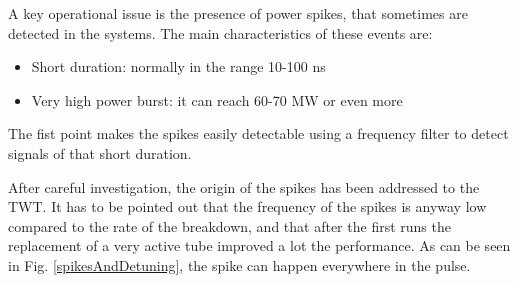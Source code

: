 A key operational issue is the presence of power spikes, that sometimes are detected in the systems. The main characteristics of these events are:
\begin{itemize}
\item Short duration: normally in the range 10-100 ns
\item Very high power burst: it can reach 60-70 MW or even more 
\end{itemize}
The fist point makes the spikes easily detectable using a frequency filter to detect signals of that short duration. 

 After careful investigation, the origin of the spikes has been addressed to the TWT. It has to be pointed out that the frequency of the spikes is anyway low compared to the rate of the breakdown, and that after the first runs the replacement of a very active tube improved a lot the performance. As can be seen in Fig. \ref{spikesAndDetuning}, the spike can happen everywhere in the pulse.

